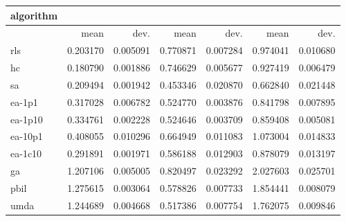 \begin{tabular}{@{}l*{6}{>{{}}N{1}{2}}@{}}
\toprule
{algorithm} &  &  &  \\
\midrule
& {mean} & {dev.} & {mean} & {dev.} & {mean} & {dev.} \\
\midrule
rls & 0.203170 & 0.005091 & 0.770871 & 0.007284 & 0.974041 & 0.010680 \\
 hc & 0.180790 & 0.001886 & 0.746629 & 0.005677 & 0.927419 & 0.006479 \\
 sa & 0.209494 & 0.001942 & 0.453346 & 0.020870 & 0.662840 & 0.021448 \\
 ea-1p1 & 0.317028 & 0.006782 & 0.524770 & 0.003876 & 0.841798 & 0.007895 \\
 ea-1p10 & 0.334761 & 0.002228 & 0.524646 & 0.003709 & 0.859408 & 0.005081 \\
 ea-10p1 & 0.408055 & 0.010296 & 0.664949 & 0.011083 & 1.073004 & 0.014833 \\
 ea-1c10 & 0.291891 & 0.001971 & 0.586188 & 0.012903 & 0.878079 & 0.013197 \\
 ga & 1.207106 & 0.005005 & 0.820497 & 0.023292 & 2.027603 & 0.025701 \\
 pbil & 1.275615 & 0.003064 & 0.578826 & 0.007733 & 1.854441 & 0.008079 \\
 umda & 1.244689 & 0.004668 & 0.517386 & 0.007754 & 1.762075 & 0.009846 \\
 \bottomrule
\end{tabular}
